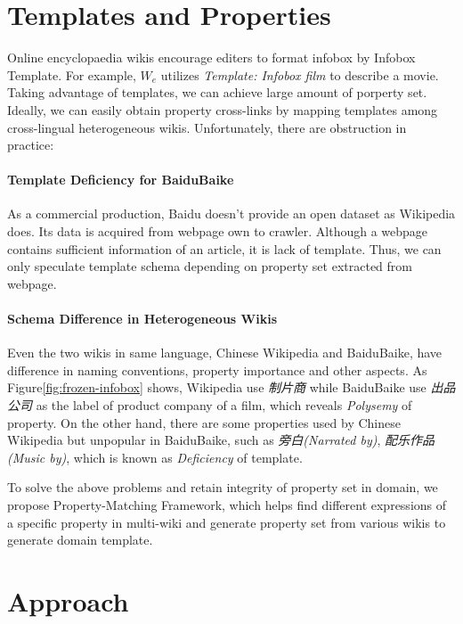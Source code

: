 \documentclass[runningheads,a4paper]{llncs}
\begin{document}
\section{Templates and Properties}

Online encyclopaedia wikis encourage editers to format infobox by Infobox Template. For example, 
$W_e$ utilizes \textit{Template: Infobox film} to describe a movie.
Taking advantage of templates, we can achieve large amount of porperty set. Ideally, we can easily obtain property cross-links by mapping templates among cross-lingual heterogeneous wikis. Unfortunately, there are obstruction in practice:

\paragraph{Template Deficiency for BaiduBaike}
As a commercial production, Baidu doesn't provide an open dataset as Wikipedia does. Its data is acquired from webpage own to crawler. Although a webpage contains sufficient information of an article, it is lack of template. Thus, we can only speculate template schema depending on property set extracted from webpage.

\paragraph{Schema Difference in Heterogeneous Wikis}
Even the two wikis in same language, Chinese Wikipedia and BaiduBaike, have difference in naming conventions, property importance and other aspects. As Figure\ref{fig:frozen-infobox} shows, Wikipedia use \textit{制片商} while BaiduBaike use \textit{出品公司} as the label of product company of a film, which reveals \emph{Polysemy} of property. On the other hand, there are some properties used by Chinese Wikipedia but unpopular in BaiduBaike, such as \textit{旁白(Narrated by)}, \textit{配乐作品(Music by)}, which is known as \emph{Deficiency} of template. 

To solve the above problems and retain integrity of property set in domain, we propose Property-Matching Framework, which helps find different expressions of a specific property in multi-wiki and generate property set from various wikis to generate domain template.

\section{Approach}
\end{document}
